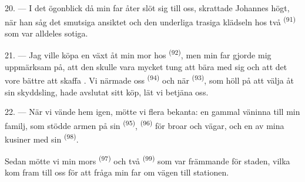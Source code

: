 \VUsaut{3.0mm}

20. --- I det ögonblick då min far åter slöt sig till oss, skrattade Johannes högt, när han
såg det smutsiga ansiktet och den underliga trasiga klädseln hos två 
\textsuperscript{(91)} som var alldeles sotiga.

21. --- Jag ville köpa en växt åt min mor hos 
\textsuperscript{(92)}, men min far gjorde mig uppmärksam på, att den skulle vara mycket tung
att bära med sig och att det vore bättre att skaffa
. Vi närmade oss 
\textsuperscript{(94)} och när  \textsuperscript{(93)}, som höll på att
välja åt sin skyddsling, hade avslutat sitt köp, lät vi betjäna oss.

22. --- När vi vände hem igen, mötte vi flera bekanta: en gammal väninna till min familj, som
stödde armen på sin  \textsuperscript{(95)}, 
\textsuperscript{(96)} för broar och vägar, och en av mina kusiner med sin
 \textsuperscript{(98)}.

Sedan mötte vi min mors  \textsuperscript{(97)} och två
 \textsuperscript{(99)} som var främmande för staden, vilka kom
fram till oss för att fråga min far om vägen till stationen.

\VUsaut{6.0mm}
\VUfilet{22mm}
